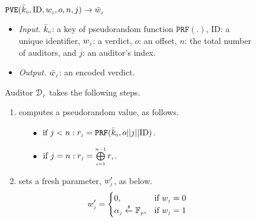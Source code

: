  \vspace{-1.8mm}
\begin{figure}[!htbp]
\setlength{\fboxsep}{1pt}
\begin{center}
    \begin{tcolorbox}[enhanced,width=81mm, height=66.5mm, left=0mm,
    drop fuzzy shadow southwest,
    colframe=black,colback=white]
   { \small{
    \vspace{-2.1mm}
\underline{$\mathtt{PVE}(\bar{k}_{\scriptscriptstyle 0}, \text{ID},  w_{\scriptscriptstyle j}, o, n,  j)\rightarrow  \bar{  w}_{\scriptscriptstyle j}$}\\
%
    \vspace{-1mm}
\begin{itemize}[leftmargin=4.2mm]
\item \noindent\textit{Input.} $\bar{k}_{\scriptscriptstyle 0}$: a key of  pseudorandom function $\mathtt{PRF}(.)$, $\text{ID}$: a unique identifier, $ w_{\scriptscriptstyle j}$: a  verdict, $o$: an offset, $n$: the total number of  auditors,  and  $j$: an auditor's index.
%
\item \noindent\textit{Output.} $\bar{  w}_{\scriptscriptstyle j}$:  an  encoded verdict.  
%
\end{itemize}
Auditor $\mathcal{D}_{\scriptscriptstyle j}$ takes the following steps.
    \vspace{-1.2mm}
\begin{enumerate}[leftmargin=5.2mm]
%
\item\label{ZSPA:val-gen} computes a  pseudorandom  value,  as follows. 
%
\begin{itemize}
%
\item[$\bullet$]$ \text{ if } j< n: r_{\scriptscriptstyle j}=\mathtt{PRF}(\bar k_{\scriptscriptstyle 0}, o||j||\text{ID})$.\\
%
    \vspace{-1.6mm}
\item [$\bullet$] $ \text{ if } j=n: r_{\scriptscriptstyle j}= \bigoplus\limits^{\scriptscriptstyle n-1}_{\scriptscriptstyle i=1} r_{\scriptscriptstyle i}$.
%
\end{itemize}
%
\item  sets a fresh parameter, $w'_{\scriptscriptstyle j}$, as below. 
%
    \vspace{-1.5mm}
\begin{equation*}
   w'_{\scriptscriptstyle j}= 
\begin{cases}
   0,              & \text{if } w_{\scriptscriptstyle j}=0\\
   \alpha_{\scriptscriptstyle j}\stackrel{\scriptscriptstyle\$}\leftarrow \mathbb{F}_{\scriptscriptstyle p} ,& \text{if } w_{\scriptscriptstyle j}=1\\

\end{cases}
\end{equation*}
%


\end{enumerate}}}
\end{tcolorbox}
\end{center}
\end{figure}
